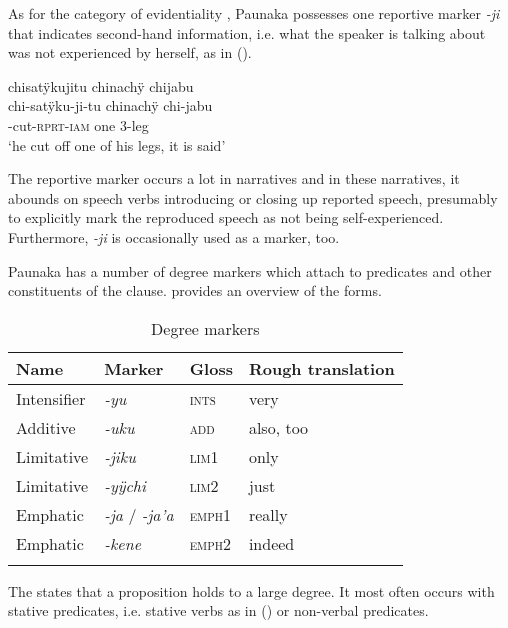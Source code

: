 As for the category of evidentiality , Paunaka possesses one reportive marker \textit{-ji} that indicates second-hand information, i.e. what the speaker is talking about was not experienced by herself, as in (). 

\ea\label{ex:Sketch-RPRT}
\begingl
\glpreamble chisatÿkujitu chinachÿ chijabu\\
\gla chi-satÿku-ji-tu chinachÿ chi-jabu\\
-cut-\textsc{rprt}-\textsc{iam} one 3-leg\\
\glft ‘he cut off one of his legs, it is said’\\
\endgl
\xe

The reportive marker occurs a lot in narratives and in these narratives, it abounds on speech verbs introducing or closing up reported speech, presumably to explicitly mark the reproduced speech as not being self-experienced. Furthermore, \textit{-ji} is occasionally used as a  marker, too.

Paunaka has a number of degree markers which attach to predicates and other constituents of the clause.  provides an overview of the forms.

\begin{table}[htbp]
\caption{Degree markers}

\begin{tabular}{llll}
\lsptoprule
Name & Marker & Gloss & Rough translation \\
\midrule
Intensifier & \textit{-yu} & \textsc{ints} & very\\
Additive & \textit{-uku} & \textsc{add} & also, too\\
Limitative & \textit{-jiku} & \textsc{lim}1 & only\\
Limitative & \textit{-yÿchi} & \textsc{lim}2 & just\\
Emphatic & \textit{-ja} / \textit{-ja’a} & \textsc{emph}1 & really\\
Emphatic & \textit{-kene} & \textsc{emph}2 & indeed\\
\lspbottomrule
\end{tabular}

\label{table:Sketch-degreemarkers}
\end{table}

The  states that a proposition holds to a large degree. It most often occurs with stative predicates, i.e. stative verbs as in () or non-verbal predicates.

